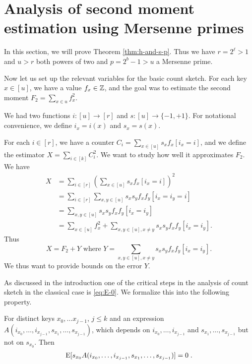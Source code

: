 


\section{Analysis of second moment estimation using  Mersenne primes}\label{sec:analysis-two-for-one}
In this section, we will prove Theorem \ref{thm:h-and-s-p}.  Thus we
have $r=2^\ell>1$ and $u>r$ both powers of two and $p=2^b-1>u$ a
Mersenne prime.

Now let us set up the relevant variables for the basic count sketch.
For each key $x\in [u]$, we have a value $f_x\in \mathbb Z$, and the
goal was to estimate the second moment $F_2 = \sum_{x\in u}f_x^2$.

We had two functions $i:[u]\to[r]$ and $s:[u]\to\{-1,+1\}$. 
For notational convenience, we define $i_x=i(x)$ and $s_x=s(x)$.

For each $i\in [r]$, we have a counter 
$C_i=\sum_{x\in[u]} s_x f_x[i_x=i]$, and we define the 
estimator $X=\sum_{i\in[k]} C_i^2$. We want to study how
well it approximates $F_2$.
We have 
\begin{align*}
X&=\sum_{i\in[r]}\left( \sum_{x\in[u]}s_x f_x[i_x=i]\right)^2\\
&=\sum_{i\in[r]}\sum_{x,y\in[u]}s_x s_y f_x f_y [i_x = i_y = i]\\
&=\sum_{x,y\in[u]}s_x s_y f_x f_y[i_x=i_y]\\
&=\sum_{x\in[u]} f_x^2+\sum_{x,y\in[u],x\neq y} s_x s_y f_x f_y[i_x=i_y] .
\end{align*}
Thus 
\begin{equation}\label{eq:decomp}
   X=F_2 + Y \mbox{ where } Y=\sum_{x,y\in[u],x\neq y} s_x s_y f_x f_y [i_x = i_y] .
\end{equation}
We thus want to provide bounds on the error $Y$.

As discussed in the introduction one of the critical steps in the analysis
of count sketch in the classical case is \cref{eq:E-0}. We formalize this into
the following property.
\begin{property}\label{prop:independence}
    For distinct keys $x_0, \ldots x_{j - 1}$, $j \le k$
    and an expression $A(i_{x_0}, \ldots, i_{x_{j - 1}}, s_{x_1}, \ldots, s_{x_{j - 1}})$,
    which depends on $i_{x_0}, \ldots, i_{x_{j - 1}}$ and $s_{x_1}, \ldots, s_{x_{j - 1}}$
    but not on $s_{x_0}$. Then
    \begin{align}
        \operatorname*{E}[s_{x_0} A(i_{x_0}, \ldots, i_{x_{j - 1}}, s_{x_1}, \ldots, s_{x_{j - 1}})] = 0\; .
    \end{align}
\end{property}

